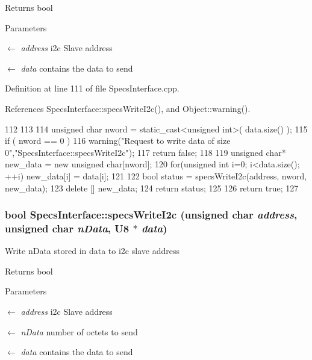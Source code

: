 \begin{DoxyReturn}{Returns}
bool 
\end{DoxyReturn}

\begin{DoxyParams}{Parameters}
\item[\mbox{$\leftarrow$} {\em address}]i2c Slave address \item[\mbox{$\leftarrow$} {\em data}]contains the data to send \end{DoxyParams}


Definition at line 111 of file SpecsInterface.cpp.

References SpecsInterface::specsWriteI2c(), and Object::warning().


\begin{DoxyCode}
112                                                       {
113 
114   unsigned char nword = static_cast<unsigned int>( data.size() );
115   if ( nword == 0 ) {
116     warning("Request to write data of size 0","SpecsInterface::specsWriteI2c");
117     return false;
118   }
119   unsigned char* new_data = new unsigned char[nword];
120   for(unsigned int i=0; i<data.size(); ++i) new_data[i] = data[i];
121  
122   bool status =     specsWriteI2c(address, nword, new_data);
123   delete [] new_data;
124   return status;
125 
126   return true;
127 }
\end{DoxyCode}
\hypertarget{classSpecsInterface_a20dacf68396a40eadbb740db73ff9624}{
\subsubsection[{specsWriteI2c}]{\setlength{\rightskip}{0pt plus 5cm}bool SpecsInterface::specsWriteI2c (unsigned char {\em address}, \/  unsigned char {\em nData}, \/  {\bf U8} $\ast$ {\em data})}}
\label{classSpecsInterface_a20dacf68396a40eadbb740db73ff9624}
Write nData stored in data to i2c slave address

\begin{DoxyReturn}{Returns}
bool 
\end{DoxyReturn}

\begin{DoxyParams}{Parameters}
\item[\mbox{$\leftarrow$} {\em address}]i2c Slave address \item[\mbox{$\leftarrow$} {\em nData}]number of octets to send \item[\mbox{$\leftarrow$} {\em data}]contains the data to send \end{DoxyParams}


